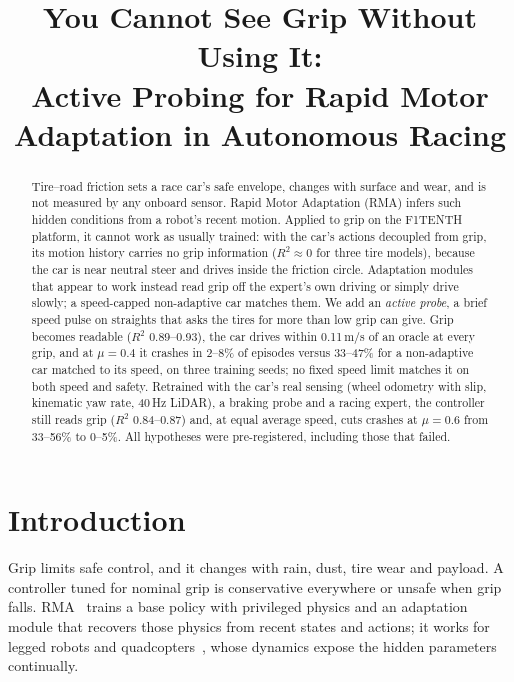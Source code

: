 \documentclass[conference]{IEEEtran}
\begin{document}
\title{You Cannot See Grip Without Using It:\\Active Probing for Rapid Motor Adaptation in Autonomous Racing}

\author{
\and
{}
}

\maketitle

\begin{abstract}
Tire--road friction sets a race car's safe envelope, changes with surface and wear, and is not measured by any onboard sensor. Rapid Motor Adaptation (RMA) infers such hidden conditions from a robot's recent motion. Applied to grip on the F1TENTH platform, it cannot work as usually trained: with the car's actions decoupled from grip, its motion history carries no grip information ($R^2\!\approx\!0$ for three tire models), because the car is near neutral steer and drives inside the friction circle. Adaptation modules that appear to work instead read grip off the expert's own driving or simply drive slowly; a speed-capped non-adaptive car matches them. We add an \emph{active probe}, a brief speed pulse on straights that asks the tires for more than low grip can give. Grip becomes readable ($R^2$ 0.89--0.93), the car drives within 0.11\,m/s of an oracle at every grip, and at $\mu\!=\!0.4$ it crashes in 2--8\% of episodes versus 33--47\% for a non-adaptive car matched to its speed, on three training seeds; no fixed speed limit matches it on both speed and safety. Retrained with the car's real sensing (wheel odometry with slip, kinematic yaw rate, 40\,Hz LiDAR), a braking probe and a racing expert, the controller still reads grip ($R^2$ 0.84--0.87) and, at equal average speed, cuts crashes at $\mu\!=\!0.6$ from 33--56\% to 0--5\%. All hypotheses were pre-registered, including those that failed.
\end{abstract}

\section{Introduction}
Grip limits safe control, and it changes with rain, dust, tire wear and payload. A controller tuned for nominal grip is conservative everywhere or unsafe when grip falls. RMA~\cite{kumar2021rma} trains a base policy with privileged physics and an adaptation module that recovers those physics from recent states and actions; it works for legged robots and quadcopters~\cite{zhang2025extreme}, whose dynamics expose the hidden parameters continually.
\end{document}
